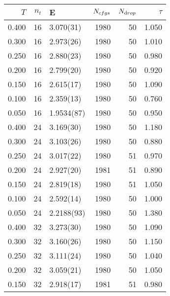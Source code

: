 \begin{tabular}{rrlrrr}
\hline
   $T$ &   $n_t$ & E          &   $N_{\textrm cfgs}$ &   $N_{\textrm drop}$ &   $\tau$ \\
\hline
 0.400 &      16 & 3.070(31)  &                 1980 &                   50 &    1.050 \\
 0.300 &      16 & 2.973(26)  &                 1980 &                   50 &    1.010 \\
 0.250 &      16 & 2.880(23)  &                 1980 &                   50 &    0.980 \\
 0.200 &      16 & 2.799(20)  &                 1980 &                   50 &    0.920 \\
 0.150 &      16 & 2.615(17)  &                 1980 &                   50 &    1.090 \\
 0.100 &      16 & 2.359(13)  &                 1980 &                   50 &    0.760 \\
 0.050 &      16 & 1.9534(87) &                 1980 &                   50 &    0.950 \\
 0.400 &      24 & 3.169(30)  &                 1980 &                   50 &    1.180 \\
 0.300 &      24 & 3.103(26)  &                 1980 &                   50 &    0.880 \\
 0.250 &      24 & 3.017(22)  &                 1980 &                   51 &    0.970 \\
 0.200 &      24 & 2.927(20)  &                 1981 &                   51 &    0.890 \\
 0.150 &      24 & 2.819(18)  &                 1980 &                   51 &    1.050 \\
 0.100 &      24 & 2.592(14)  &                 1980 &                   50 &    1.000 \\
 0.050 &      24 & 2.2188(93) &                 1980 &                   50 &    1.380 \\
 0.400 &      32 & 3.273(30)  &                 1980 &                   50 &    1.090 \\
 0.300 &      32 & 3.160(26)  &                 1980 &                   50 &    1.150 \\
 0.250 &      32 & 3.111(24)  &                 1980 &                   50 &    1.040 \\
 0.200 &      32 & 3.059(21)  &                 1980 &                   50 &    1.050 \\
 0.150 &      32 & 2.918(17)  &                 1981 &                   51 &    0.980 \\

\end{tabular}
